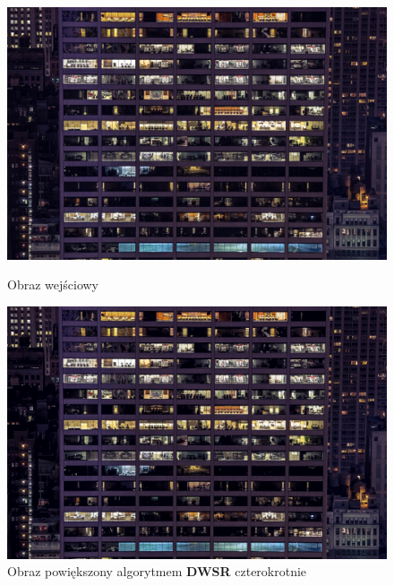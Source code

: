 \begin{figure}[ht]
    \centering
    \begin{minipage}[t]{0.45\linewidth}
        \includegraphics[width=\linewidth]{Rozdziały/03.DWSR/Obrazy/0913x4.png}
        \caption{Obraz wejściowy}
        \label{fig:image52}
    \end{minipage}
    \hspace{0.5cm}
    \begin{minipage}[t]{0.45\linewidth}
        \includegraphics[width=\linewidth]{Rozdziały/03.DWSR/Obrazy/0913x4_DWSRx4.png}
        \caption{Obraz powiększony algorytmem \textbf{DWSR} czterokrotnie}
        \label{fig:image53}
    \end{minipage}
\end{figure}
